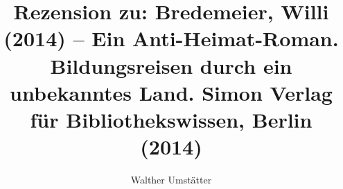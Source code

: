 
\fancyhead[R]{\thepage} %

\title{\LARGE{Rezension zu: Bredemeier, Willi (2014) – Ein Anti-Heimat-Roman. Bildungsreisen durch ein unbekanntes Land. Simon Verlag für Bibliothekswissen, Berlin (2014)}} %
\author{Walther Umstätter} %